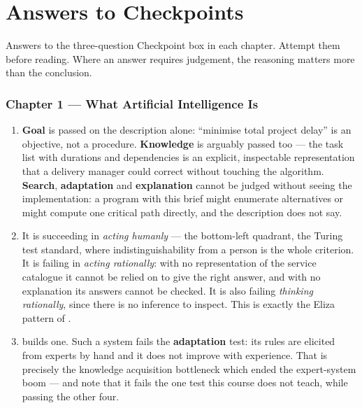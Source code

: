 \chapter{Answers to Checkpoints}\label{app:answers}
\normalfigures

Answers to the three-question Checkpoint box in each chapter. Attempt them before
reading. Where an answer requires judgement, the reasoning matters more than the
conclusion.

\newcommand{\ansch}[1]{\subsection*{\color{primary}Chapter #1}}
\newenvironment{ans}{\begin{enumerate}[leftmargin=*, itemsep=4pt, topsep=3pt,
  label=\textbf{\arabic*.}]}{\end{enumerate}}

\ansch{1 --- What Artificial Intelligence Is}
\begin{ans}
  \item \textbf{Goal} is passed on the description alone: ``minimise total project
        delay'' is an objective, not a procedure. \textbf{Knowledge} is arguably
        passed too --- the task list with durations and dependencies is an
        explicit, inspectable representation that a delivery manager could correct
        without touching the algorithm. \textbf{Search}, \textbf{adaptation} and
        \textbf{explanation} cannot be judged without seeing the implementation: a
        program with this brief might enumerate alternatives or might compute one
        critical path directly, and the description does not say.
  \item It is succeeding in \emph{acting humanly} --- the bottom-left quadrant, the
        Turing test standard, where indistinguishability from a person is the whole
        criterion. It is failing in \emph{acting rationally}: with no
        representation of the service catalogue it cannot be relied on to give the
        right answer, and with no explanation its answers cannot be checked. It is
        also failing \emph{thinking rationally}, since there is no inference to
        inspect. This is exactly the Eliza pattern of .
  \item {} builds one. Such a system fails the \textbf{adaptation}
        test: its rules are elicited from experts by hand and it does not improve
        with experience. That is precisely the knowledge acquisition bottleneck
        which ended the expert-system boom --- and note that it fails the one test
        this course does not teach, while passing the other four.
\end{ans}

